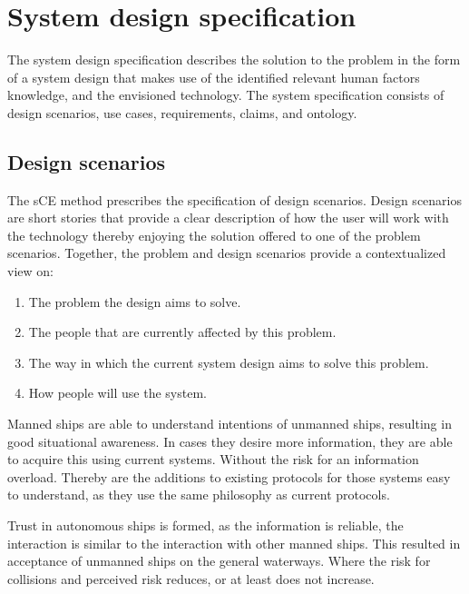 \chapter{System design specification}
\label{ch:system-design}
The system design specification describes the solution to the problem in the form of a system design that makes use of the identified relevant human factors knowledge, and the envisioned technology. The system specification consists of design scenarios, use cases, requirements, claims, and ontology.

\section{Design scenarios}
The sCE method prescribes the specification of design scenarios. Design scenarios are short stories that provide a clear description of how the user will work with the technology thereby enjoying the solution offered to one of the problem scenarios. Together, the problem and design scenarios provide a contextualized view on:
\begin{enumerate}
	\item The problem the design aims to solve.
	\item The people that are currently affected by this problem.
	\item The way in which the current system design aims to solve this problem.
	\item How people will use the system.
\end{enumerate}

Manned ships are able to understand intentions of unmanned ships, resulting in good situational awareness. In cases they desire more information, they are able to acquire this using current systems. Without the risk for an information overload. Thereby are the additions to existing protocols for those systems easy to understand, as they use the same philosophy as current protocols.

Trust in autonomous ships is formed, as the information is reliable, the interaction is similar to the interaction with other manned ships. This resulted in acceptance of unmanned ships on the general waterways. Where the risk for collisions and perceived risk reduces, or at least does not increase.

